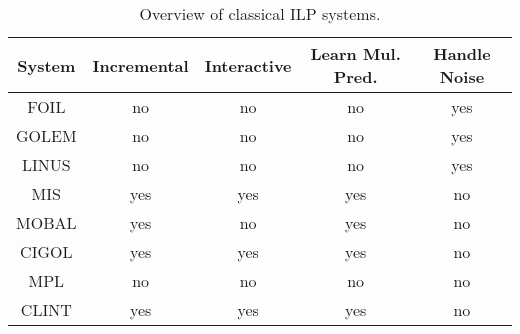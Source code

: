 \begin{table}[t]
\centering
\begin{tabular}{|c|c|c|c|c|}
\hline
System & Incremental & Interactive & Learn Mul. Pred. & Handle Noise\\
\hline
FOIL & no & no & no & yes \\
GOLEM & no & no & no & yes \\
LINUS & no & no & no & yes \\
MIS & yes & yes & yes & no \\
MOBAL & yes & no & yes & no \\
CIGOL & yes & yes & yes & no \\
MPL & no & no & no & no \\
CLINT & yes & yes & yes & no \\
\hline
\end{tabular}
\caption{Overview of classical ILP systems.}
\label{tab:ilp}
\end{table}